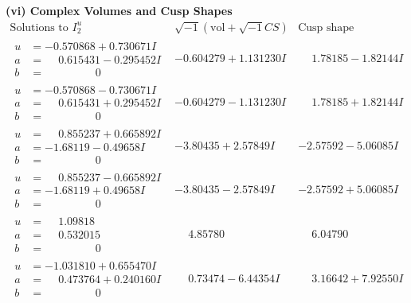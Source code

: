 \documentclass[1p]{elsarticle_modified}
\theoremstyle{definition}
\newcommand{\I}{\sqrt{-1}}
\begin{document}
\newpage\flushleft \textbf{(vi) Complex Volumes and Cusp Shapes}
$$\begin{array}{c|c|c}  
\text{Solutions to }I^u_{2}& \I (\text{vol} + \sqrt{-1}CS) & \text{Cusp shape}\\
 \hline 
\begin{aligned}
u &= -0.570868 + 0.730671 I \\
a &= \phantom{-}0.615431 - 0.295452 I \\
b &= \phantom{-0.000000 } 0\end{aligned}
 & -0.604279 + 1.131230 I & \phantom{-}1.78185 - 1.82144 I \\ \hline\begin{aligned}
u &= -0.570868 - 0.730671 I \\
a &= \phantom{-}0.615431 + 0.295452 I \\
b &= \phantom{-0.000000 } 0\end{aligned}
 & -0.604279 - 1.131230 I & \phantom{-}1.78185 + 1.82144 I \\ \hline\begin{aligned}
u &= \phantom{-}0.855237 + 0.665892 I \\
a &= -1.68119 - 0.49658 I \\
b &= \phantom{-0.000000 } 0\end{aligned}
 & -3.80435 + 2.57849 I & -2.57592 - 5.06085 I \\ \hline\begin{aligned}
u &= \phantom{-}0.855237 - 0.665892 I \\
a &= -1.68119 + 0.49658 I \\
b &= \phantom{-0.000000 } 0\end{aligned}
 & -3.80435 - 2.57849 I & -2.57592 + 5.06085 I \\ \hline\begin{aligned}
u &= \phantom{-}1.09818\phantom{ +0.000000I} \\
a &= \phantom{-}0.532015\phantom{ +0.000000I} \\
b &= \phantom{-0.000000 } 0\end{aligned}
 & \phantom{-}4.85780\phantom{ +0.000000I} & \phantom{-}6.04790\phantom{ +0.000000I} \\ \hline\begin{aligned}
u &= -1.031810 + 0.655470 I \\
a &= \phantom{-}0.473764 + 0.240160 I \\
b &= \phantom{-0.000000 } 0\end{aligned}
 & \phantom{-}0.73474 - 6.44354 I & \phantom{-}3.16642 + 7.92550 I \\ \hline\begin{aligned}

\end{aligned}
\end{array}$$
\end{document}
